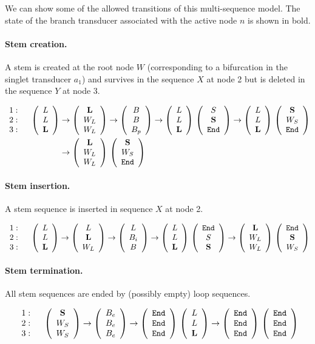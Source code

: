 \documentclass[10pt]{article}
\begin{document}
We can show some of the allowed transitions of this multi-sequence model.
The state of the branch transducer associated with the active node $n$ is shown in bold.

\paragraph{Stem creation.}

A stem is created at the root node $W$ (corresponding to a bifurcation in the singlet transducer $a_1$)
and survives in the sequence $X$ at node 2 but is deleted in the sequence $Y$ at node 3.

\begin{align}
  \begin{array}{c}1:\\2:\\3:\end{array} \quad
  \left(\begin{array}{c}L\\L\\\mathbf{L}\end{array}\right) &
  \to \left(\begin{array}{c}\mathbf{L}\\W_L\\W_L\end{array}\right)
  \to \left(\begin{array}{c}B\\B\\B_p\end{array}\right)
  \to \left(\begin{array}{c}L\\L\\\mathbf{L}\end{array}\right) \, \left(\begin{array}{c}S\\\mathbf{S}\\\mathtt{End}\end{array}\right)
  \to \left(\begin{array}{c}L\\L\\\mathbf{L}\end{array}\right) \, \left(\begin{array}{c}\mathbf{S}\\W_S\\\mathtt{End}\end{array}\right) \\
  & \to \left(\begin{array}{c}\mathbf{L}\\W_L\\W_L\end{array}\right) \, \left(\begin{array}{c}\mathbf{S}\\W_S\\\mathtt{End}\end{array}\right)
\end{align}


\paragraph{Stem insertion.}

A stem sequence is inserted in sequence $X$ at node 2.

\begin{align}
  \begin{array}{c}1:\\2:\\3:\end{array} \quad
  \left(\begin{array}{c}L\\L\\\mathbf{L}\end{array}\right) \to \left(\begin{array}{c}L\\\mathbf{L}\\W_L\end{array}\right)
  \to \left(\begin{array}{c}L\\B_i\\B\end{array}\right)
  \to \left(\begin{array}{c}L\\L\\\mathbf{L}\end{array}\right) \, \left(\begin{array}{c}\mathtt{End}\\S\\\mathbf{S}\end{array}\right)
  \to \left(\begin{array}{c}\mathbf{L}\\W_L\\W_L\end{array}\right) \, \left(\begin{array}{c}\mathtt{End}\\\mathbf{S}\\W_S\end{array}\right)
\end{align}

\paragraph{Stem termination.}

All stem sequences are ended by (possibly empty) loop sequences.

\begin{align}
  \begin{array}{c}1:\\2:\\3:\end{array} \quad
  \left(\begin{array}{c}\mathbf{S}\\W_S\\W_S\end{array}\right)
  \to \left(\begin{array}{c}B_e\\B_e\\B_e\end{array}\right)
  \to \left(\begin{array}{c}\mathtt{End}\\\mathtt{End}\\\mathtt{End}\end{array}\right) \, \left(\begin{array}{c}L\\L\\\mathbf{L}\end{array}\right)
  \to \left(\begin{array}{c}\mathtt{End}\\\mathtt{End}\\\mathtt{End}\end{array}\right) \, \left(\begin{array}{c}\mathtt{End}\\\mathtt{End}\\\mathtt{End}\end{array}\right)
\end{align}
\end{document}
